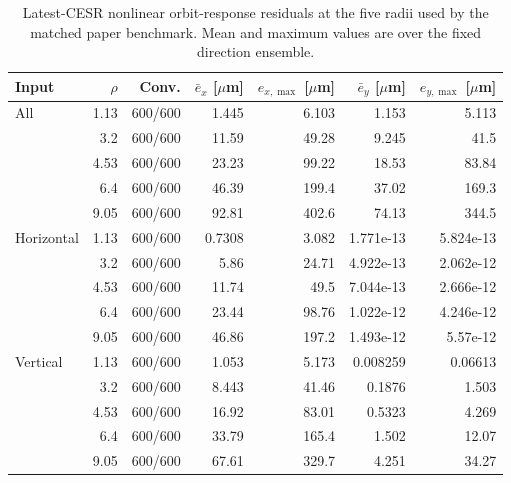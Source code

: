 \begin{table}[!t]
  \centering
  \caption{Latest-CESR nonlinear orbit-response residuals at the five radii used by the matched paper benchmark. Mean and maximum values are over the fixed direction ensemble.}
  \scriptsize
  \setlength{\tabcolsep}{3.2pt}
  \begin{tabular}{lrrrrrr}
    \toprule
    Input & $\rho$ & Conv. & $\bar e_x$ [$\mu$m] & $e_{x,\max}$ [$\mu$m] & $\bar e_y$ [$\mu$m] & $e_{y,\max}$ [$\mu$m] \\
    \midrule
    All & 1.13 & 600/600 & 1.445 & 6.103 & 1.153 & 5.113 \\
     & 3.2 & 600/600 & 11.59 & 49.28 & 9.245 & 41.5 \\
     & 4.53 & 600/600 & 23.23 & 99.22 & 18.53 & 83.84 \\
     & 6.4 & 600/600 & 46.39 & 199.4 & 37.02 & 169.3 \\
     & 9.05 & 600/600 & 92.81 & 402.6 & 74.13 & 344.5 \\
    Horizontal & 1.13 & 600/600 & 0.7308 & 3.082 & 1.771e-13 & 5.824e-13 \\
     & 3.2 & 600/600 & 5.86 & 24.71 & 4.922e-13 & 2.062e-12 \\
     & 4.53 & 600/600 & 11.74 & 49.5 & 7.044e-13 & 2.666e-12 \\
     & 6.4 & 600/600 & 23.44 & 98.76 & 1.022e-12 & 4.246e-12 \\
     & 9.05 & 600/600 & 46.86 & 197.2 & 1.493e-12 & 5.57e-12 \\
    Vertical & 1.13 & 600/600 & 1.053 & 5.173 & 0.008259 & 0.06613 \\
     & 3.2 & 600/600 & 8.443 & 41.46 & 0.1876 & 1.503 \\
     & 4.53 & 600/600 & 16.92 & 83.01 & 0.5323 & 4.269 \\
     & 6.4 & 600/600 & 33.79 & 165.4 & 1.502 & 12.07 \\
     & 9.05 & 600/600 & 67.61 & 329.7 & 4.251 & 34.27 \\
    \bottomrule
  \end{tabular}
  \label{tab:latest-cesr-rho-response}
\end{table}

